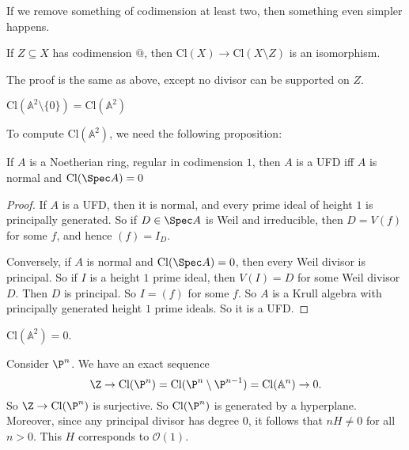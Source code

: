 \documentclass[a4paper]{article}
\newcommand\A{\mathbb{A}}
\newcommand\Cl{\mathrm{Cl}}
\begin{document}
If we remove something of codimension at least two, then something even simpler happens.
\begin{prop}
  If $Z \subseteq X$ has codimension $@$, then $\Cl(X) \to \Cl(X \setminus Z)$ is an isomorphism.
\end{prop}
The proof is the same as above, except no divisor can be supported on $Z$.

\begin{eg}
  $\Cl(\A^2 \setminus \{0\}) = \Cl(\A^2)$
\end{eg}
To compute $\Cl(\A^2)$, we need the following proposition:
\begin{prop}
  If $A$ is a Noetherian ring, regular in codimension $1$, then $A$ is a UFD iff $A$ is normal and $\Cl(\Spec A) = 0$
\end{prop}

\begin{proof}
  If $A$ is a UFD, then it is normal, and every prime ideal of height $1$ is principally generated. So if $D \in \Spec A$ is Weil and irreducible, then $D = V(f)$ for some $f$, and hence $(f) = I_D$.

  Conversely, if $A$ is normal and $\Cl(\Spec A) = 0$, then every Weil divisor is principal. So if $I$ is a height $1$ prime ideal, then $V(I) = D$ for some Weil divisor $D$. Then $D$ is principal. So $I = (f)$ for some $f$. So $A$ is a Krull algebra with principally generated height $1$ prime ideals. So it is a UFD.
\end{proof}

\begin{eg}
  $\Cl(\A^2) = 0$.
\end{eg}

\begin{eg}
  Consider $\P^n$. We have an exact sequence
  \[
    \Z \to \Cl(\P^n) = \Cl(\P^n \setminus \P^{n - 1}) = \Cl(\A^n) \to 0.
  \]
  So $\Z \to \Cl(\P^n)$ is surjective. So $\Cl(\P^n)$ is generated by a hyperplane. Moreover, since any principal divisor has degree $0$, it follows that $nH \not= 0$ for all $n > 0$. This $H$ corresponds to $\mathcal{O}(1)$.
\end{eg}
\end{document}
